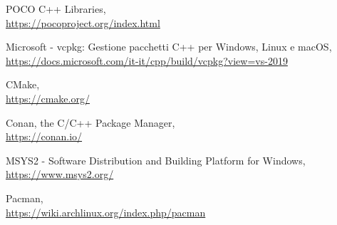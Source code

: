 \documentclass[a4paper,12pt,oneside]{book}
\begin{document}
\begin{thebibliography}{9}
	POCO C++ Libraries,
	\\\url{https://pocoproject.org/index.html}
	
	Microsoft - vcpkg: Gestione pacchetti C++ per Windows, Linux e macOS,
	\\\url{https://docs.microsoft.com/it-it/cpp/build/vcpkg?view=vs-2019}
	
	CMake,
	\\\url{https://cmake.org/}
	
	Conan, the C/C++ Package Manager,
	\\\url{https://conan.io/}
	
	MSYS2 - Software Distribution and Building Platform for Windows,
	\\\url{https://www.msys2.org/}
	
	Pacman,
	\\\url{https://wiki.archlinux.org/index.php/pacman}

\end{thebibliography}
\end{document}
